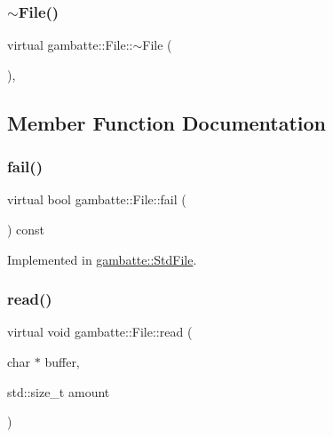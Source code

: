 \subsubsection{\texorpdfstring{$\sim$\+File()}{~File()}}
{\footnotesize\ttfamily virtual gambatte\+::\+File\+::$\sim$\+File (\begin{DoxyParamCaption}{ }\end{DoxyParamCaption})\hspace{0.3cm}{\ttfamily [inline]}, {\ttfamily [virtual]}}



\subsection{Member Function Documentation}
\mbox{\label{classgambatte_1_1File_ac4e6a7055cd91176c9fb3e9215370c51}} 
\subsubsection{\texorpdfstring{fail()}{fail()}}
{\footnotesize\ttfamily virtual bool gambatte\+::\+File\+::fail (\begin{DoxyParamCaption}{ }\end{DoxyParamCaption}) const\hspace{0.3cm}{\ttfamily [pure virtual]}}



Implemented in \hyperlink{classgambatte_1_1StdFile_aa4f8f0f2854e3b11a71cb3d3109908eb}{gambatte\+::\+Std\+File}.

\mbox{\label{classgambatte_1_1File_a58a6f97f55c93d15c9aa067d2a6db123}} 
\subsubsection{\texorpdfstring{read()}{read()}}
{\footnotesize\ttfamily virtual void gambatte\+::\+File\+::read (\begin{DoxyParamCaption}\item[{char $\ast$}]{buffer,  }\item[{std\+::size\+\_\+t}]{amount }\end{DoxyParamCaption})\hspace{0.3cm}{\ttfamily [pure virtual]}}



